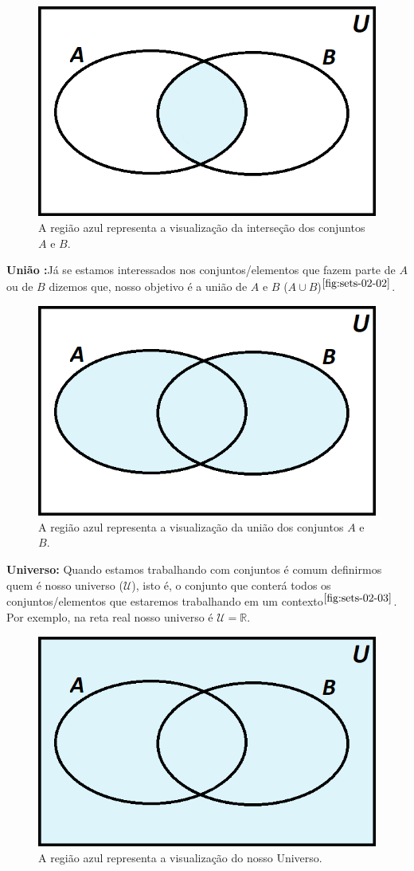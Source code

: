     \begin{figure}[hbt!]
        \centering      
        \includegraphics[width = 7 cm]{figures/sets/fig-sets-02-01.png}
        \caption{A região azul representa a visualização da interseção dos conjuntos $A$ e $B$.}
        \label{fig:sets-02-01}
    \end{figure}
    
    \textbf{União :}Já se estamos interessados nos conjuntos/elementos que fazem parte de $A$ ou de $B$ dizemos que, nosso objetivo é a união de $A$ e $B$ ($A \cup B$)$^{\ref{fig:sets-02-02}}$.
    
    \begin{figure}[hbt!]
        \centering      
        \includegraphics[width = 7 cm]{figures/sets/fig-sets-02-02.png}
        \caption{A região azul representa a visualização da união dos conjuntos $A$ e $B$.}
        \label{fig:sets-02-02}
    \end{figure}
    
    \textbf{Universo:} Quando estamos trabalhando com conjuntos é comum definirmos quem é nosso universo ($ \mathcal U $), isto é, o conjunto que conterá todos os conjuntos/elementos que estaremos trabalhando em um contexto$^{\ref{fig:sets-02-03}}$. Por exemplo, na reta real nosso universo é $\mathcal U = \mathbb{R}$.
    
    \begin{figure}[hbt!]
        \centering      
        \includegraphics[width = 7 cm]{figures/sets/fig-sets-02-03.png}
        \caption{A região azul representa a visualização do nosso Universo.}
        \label{fig:sets-02-03}
    \end{figure}
    
